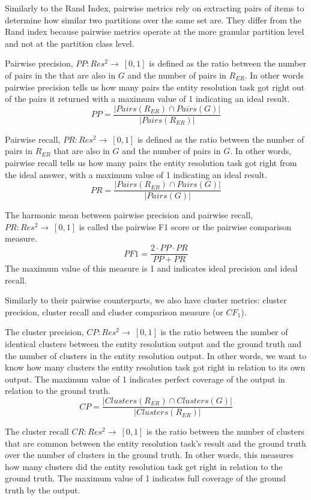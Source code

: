 Similarly to the Rand Index, pairwise metrics rely on extracting pairs of items
to determine how similar two partitions over the same set are.
They differ from the Rand index because pairwise metrics operate at the more
granular partition level and not at the partition class level.

Pairwise precision, $PP:Res^2\rightarrow~\left[0,1\right]$ is defined as the
ratio between the number of pairs in the  that are also in $G$ and the number
of pairs in $R_{ER}$.
In other words pairwise precision tells us how many pairs the entity
resolution task got right out of the pairs it returned with a maximum value of
1 indicating an ideal result.
\[
    PP = \frac{|Pairs(R_{ER}) \cap Pairs(G)|}{|Pairs(R_{ER})|}
\]

Pairwise recall, $PR:Res^2\rightarrow~\left[0,1\right]$ is defined as the ratio
between the number of pairs in $R_{ER}$ that are also in $G$ and the number of
pairs in $G$.
In other words, pairwise recall tells us how many pairs the entity
resolution task got right from the ideal answer, with a maximum value of 1
indicating an ideal result.
\[
    PR = \frac{|Pairs(R_{ER}) \cap Pairs(G)|}{|Pairs(G)|}
\]

The harmonic mean between pairwise precision and pairwise recall,
$PR:Res^2\rightarrow~\left[0,1\right]$ is called the pairwise F1 score or the
pairwise comparison measure\cite{Men10}.
\[
    PF1=\frac{2 \cdot PP \cdot PR}{PP + PR}
\]
The maximum value of this measure is 1 and indicates ideal precision and ideal
recall.

Similarly to their pairwise counterparts, we also have cluster metrics: cluster
precision, cluster recall and cluster comparison measure (or $CF_1$).

The cluster precision, $CP:Res^2\rightarrow~\left[0,1\right]$ is the ratio
between the number of identical clusters between the entity resolution output
and the ground truth and the number of clusters in the entity resolution output.
In other words, we want to know how many clusters the entity resolution task
got right in relation to its own output.
The maximum value of 1 indicates perfect coverage of the output in relation to
the ground truth.
\[
    CP=\frac{|Clusters(R_{ER}) \cap Clusters(G)|}{|Clusters(R_{ER})|}
\]

The cluster recall $CR:Res^2\rightarrow~\left[0,1\right]$ is the ratio between
the number of clusters that are common between the entity resolution task's
result and the ground truth over the number of clusters in the ground truth.
In other words, this measures how many clusters did the entity resolution
task get right in relation to the ground truth.
The maximum value of 1 indicates full coverage of the ground truth by the
output.

